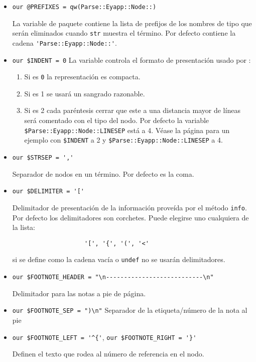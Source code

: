 \begin{itemize}
\item \verb|our @PREFIXES = qw(Parse::Eyapp::Node::)|

La variable de paquete  contiene
la lista de prefijos de los nombres de tipo que serán eliminados
cuando \verb|str| muestra el término. Por defecto contiene 
la cadena \verb|'Parse::Eyapp::Node::'|. 

\item \verb|our $INDENT = 0|
La variable  controla el formato de presentación
usado por :
\begin{enumerate}
\item
Si es \verb|0| la representación es compacta.
\item
Si es 1 se usará un sangrado razonable. 
\item
Si es 2 cada paréntesis cerrar que este a una distancia 
mayor de  líneas será comentado con el tipo del nodo. 
Por defecto la variable \verb|$Parse::Eyapp::Node::LINESEP| está a 4.
Véase la página 
\pageref{code:indent2}
para un ejemplo con \verb|$INDENT| a 2 y 
\verb|$Parse::Eyapp::Node::LINESEP| a 4.
\end{enumerate}

\item \verb|our $STRSEP = ','|

Separador de nodos en un término. Por defecto es la coma.

\item \verb|our $DELIMITER = '['|

Delimitador de presentación de la información proveída por el método
\verb|info|. Por defecto los delimitadores son corchetes. Puede elegirse 
uno cualquiera de  la lista:
\begin{verbatim}
                    '[', '{', '(', '<'
\end{verbatim}
si se define como la cadena vacía o \verb|undef| no se usarán delimitadores.

\item \verb|our $FOOTNOTE_HEADER = "\n---------------------------\n"|

Delimitador para las notas a pie de página.

\item \verb|our $FOOTNOTE_SEP = ")\n"|
Separador de la etiqueta/número de la nota al pie

\item \verb|our $FOOTNOTE_LEFT = '^{'|, \verb|our $FOOTNOTE_RIGHT = '}'|

Definen el texto que rodea al número de referencia en el nodo.


\end{itemize}


